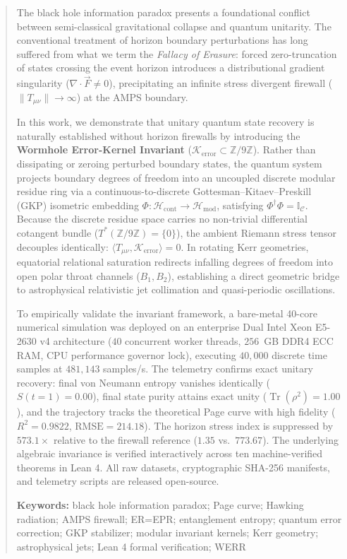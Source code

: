 \documentclass[11pt,a4paper]{article}
\newcommand{\Kerr}{\mathcal{K}_{\text{error}}}
\begin{document}
\begin{abstract}
\noindent The black hole information paradox presents a foundational conflict between semi-classical gravitational collapse and quantum unitarity. The conventional treatment of horizon boundary perturbations has long suffered from what we term the \emph{Fallacy of Erasure}: forced zero-truncation of states crossing the event horizon introduces a distributional gradient singularity ($\nabla \cdot \vec{F} \neq 0$), precipitating an infinite stress divergent firewall ($\|T_{\mu\nu}\| \to \infty$) at the AMPS boundary. 

In this work, we demonstrate that unitary quantum state recovery is naturally established without horizon firewalls by introducing the \textbf{Wormhole Error-Kernel Invariant} ($\Kerr \subset \mathbb{Z}/9\mathbb{Z}$). Rather than dissipating or zeroing perturbed boundary states, the quantum system projects boundary degrees of freedom into an uncoupled discrete modular residue ring via a continuous-to-discrete Gottesman--Kitaev--Preskill (GKP) isometric embedding $\Phi: \mathcal{H}_{\text{cont}} \to \mathcal{H}_{\text{mod}}$, satisfying $\Phi^\dagger \Phi = \mathbb{I}_{\mathcal{C}}$. Because the discrete residue space carries no non-trivial differential cotangent bundle ($T^*(\mathbb{Z}/9\mathbb{Z}) = \{0\}$), the ambient Riemann stress tensor decouples identically: $\langle T_{\mu\nu}, \Kerr \rangle = 0$. In rotating Kerr geometries, equatorial relational saturation redirects infalling degrees of freedom into open polar throat channels ($B_1, B_2$), establishing a direct geometric bridge to astrophysical relativistic jet collimation and quasi-periodic oscillations.

To empirically validate the invariant framework, a bare-metal 40-core numerical simulation was deployed on an enterprise Dual Intel Xeon E5-2630 v4 architecture ($40$ concurrent worker threads, $256$~GB DDR4 ECC RAM, CPU performance governor lock), executing $40{,}000$ discrete time samples at $481{,}143$ samples/s. The telemetry confirms exact unitary recovery: final von Neumann entropy vanishes identically ($S(t=1) = 0.00$), final state purity attains exact unity ($\operatorname{Tr}(\rho^2) = 1.00$), and the trajectory tracks the theoretical Page curve with high fidelity ($R^2 = 0.9822$, $\text{RMSE} = 214.18$). The horizon stress index is suppressed by $573.1\times$ relative to the firewall reference ($1.35$ vs.\ $773.67$). The underlying algebraic invariance is verified interactively across ten machine-verified theorems in Lean 4. All raw datasets, cryptographic SHA-256 manifests, and telemetry scripts are released open-source.

\medskip\noindent\textbf{Keywords:} black hole information paradox; Page curve; Hawking radiation; AMPS firewall; ER=EPR; entanglement entropy; quantum error correction; GKP stabilizer; modular invariant kernels; Kerr geometry; astrophysical jets; Lean 4 formal verification; WERR
\end{abstract}
\end{document}
